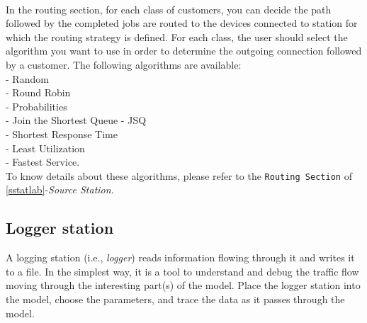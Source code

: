 \\ In the routing section, for
each class of customers, you can decide the path followed by the
completed jobs are routed to the devices connected to station for
which the routing strategy is defined.
For each class, the user should select the algorithm you want to
use in order to determine the outgoing connection followed by a
customer.
The following algorithms are available:\\
- Random\\ - Round Robin\\ - Probabilities\\ - Join the Shortest Queue - JSQ\\
- Shortest Response Time\\ - Least Utilization\\ - Fastest Service.\\
To know details about these algorithms, please refer to the
\texttt{Routing Section} of \autoref{sstatlab}-\emph{Source
Station}.



\subsection{Logger station}
\label{logsta} A logging station (i.e., \emph{logger}) reads information
flowing through it and writes it to a file.   In the simplest way,
it is a tool to understand and debug the traffic flow moving
through the interesting part(s) of the model. Place the logger
station into the model, choose the parameters, and trace the data
as it passes through the model.\\

